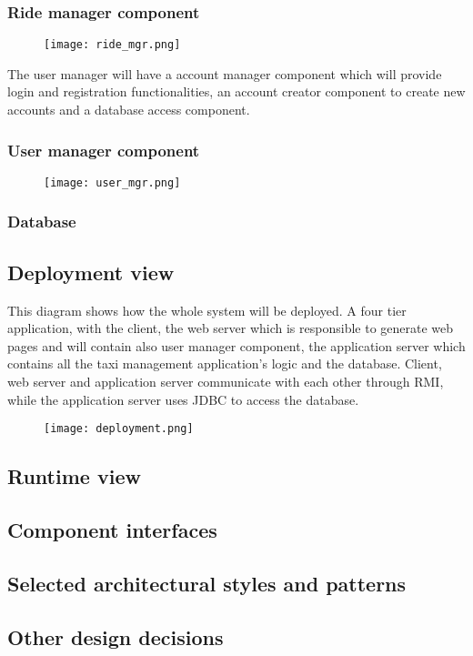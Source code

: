 	\subsubsection{Ride manager component}
		\begin{figure}[h!]
			\centering
			\texttt{[image: ride\_mgr.png]}
		\end{figure}
		\newpage
	The user manager will have a account manager component which will provide login and registration functionalities, an account creator component to create new accounts and a database access component.
	\subsubsection{User manager component}
		\begin{figure}[h!]
			\centering
			\texttt{[image: user\_mgr.png]}
		\end{figure}
		\newpage
	
	\subsubsection{Database}
	\begin{figure}[h!]
		\centering
	\end{figure}
	\newpage		

\subsection{Deployment view}
This diagram shows how the whole system will be deployed.
A four tier application, with the client, the web server which is responsible to generate web pages and will contain also user manager component, the application server which contains all the taxi management application's logic and the database.
Client, web server and application server communicate with each other through RMI, while the application server uses JDBC to access the database.
	\begin{figure}[h!]
		\centering
		\texttt{[image: deployment.png]}
	\end{figure}
	\newpage

\subsection{Runtime view}

\subsection{Component interfaces}

\subsection{Selected architectural styles and patterns}

\subsection{Other design decisions}